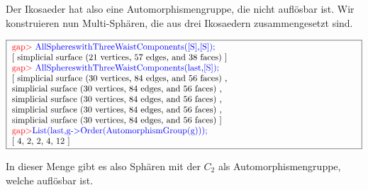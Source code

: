 \documentclass[12pt,titlepage,twoside,cleardoublepage]{article}
\theoremstyle{nummermitklammern}
\numberwithin{equation}{section}
\begin{document}
Der Ikosaeder hat also eine Automorphismengruppe, die nicht auflösbar ist. Wir konstruieren nun Multi-Sphären, die aus drei Ikosaedern zusammengesetzt sind.
\begin{center}
$\fbox{
\parbox{14cm}{
\textcolor{red}{gap$>$} \textcolor{blue}{AllSphereswithThreeWaistComponents([S],[S]);}\newline
[ simplicial surface (21 vertices, 57 edges, and 38 faces)
 ]\newline
\textcolor{red}{gap$>$} \textcolor{blue}{AllSphereswithThreeWaistComponents(last,[S]);}\newline
[ simplicial surface (30 vertices, 84 edges, and 56 faces)
    ,\newline simplicial surface (30 vertices, 84 edges, and 56 faces)
    , \newline simplicial surface (30 vertices, 84 edges, and 56 faces)
    ,\newline simplicial surface (30 vertices, 84 edges, and 56 faces)
    ,\newline
  simplicial surface (30 vertices, 84 edges, and 56 faces)
 ]\newline
\textcolor{red}{gap$>$}\textcolor{blue}{ List(last,g-$>$Order(AutomorphismGroup(g)));}\newline
[ 4, 2, 2, 4, 12 ]
}}$
\end{center}
In dieser Menge gibt es also Sphären mit der $C_2$ als Automorphismengruppe, welche auflösbar ist.
\end{document}
